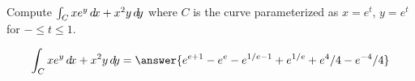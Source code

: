 \documentclass{ximera}
\author{David Guichard \and Neal Koblitz \and H. Jerome Keisler \and Albert Scheller \and Barry Balof \and Mike Wills \and Matthew Carr}
\begin{document}
\begin{exercise}




Compute $\int_C xe^y\mathop{}\!d\! x+x^2 y\mathop{}\!d\! y$ where $C$ is the curve parameterized as $x=e^t$, $y=e^t$ for $-\le t\le 1$.

\begin{prompt}
\[
\int_C xe^y\d x+x^2 y\d y=\answer{e^{e+1}-e^e-e^{1/e-1}+e^{1/e}+e^4/4-e^{-4}/4}
\]
\end{prompt}



\end{exercise}
\end{document}
